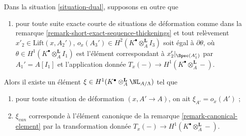 \begin{lemma}
\label{lemma-dual-obstruction}
Dans la situation \ref{situation-dual}, supposons en outre que
\begin{enumerate}
\item[(iv)] pour toute suite exacte courte de situations de déformation
comme dans la remarque \ref{remark-short-exact-sequence-thickenings} et tout
relèvement $x'_2 \in \text{Lift}(x, A_2')$,
$o_x(A_3') \in H^2(K^\bullet \otimes_A^\mathbf{L} I_3)$
soit égal à $\partial\theta$, où
$\theta \in H^1(K^\bullet \otimes_A^\mathbf{L} I_1)$
est l'élément correspondant à $x'_2|_{\Spec(A_1')}$ par
$A_1' = A[I_1]$ et l'application donnée
$T_x(-) \to H^1(K^\bullet \otimes_A^\mathbf{L} -)$.
\end{enumerate}
Alors il existe un élément
$\xi \in H^1(K^\bullet \otimes_A^\mathbf{L} \NL_{A/\Lambda})$
tel que
\begin{enumerate}
\item pour toute situation de déformation $(x, A' \to A)$, on ait
$\xi_{A'} = o_x(A')$ ;
\item $\xi_{can}$ corresponde à l'élément canonique de la
remarque \ref{remark-canonical-element} par la transformation donnée
$T_x(-) \to H^1(K^\bullet \otimes_A^\mathbf{L} -)$.
\end{enumerate}
\end{lemma}

